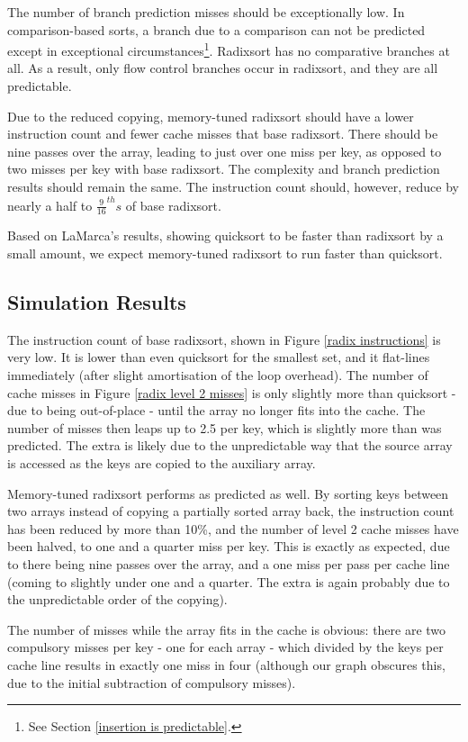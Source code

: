 The number of branch prediction misses should be exceptionally low. In
comparison-based sorts, a branch due to a comparison can not be predicted except
in exceptional circumstances\footnote{See Section \ref{insertion is
predictable}.}. Radixsort has no comparative branches at all. As a result, only
flow control branches occur in radixsort, and they are all predictable.

Due to the reduced copying, memory-tuned radixsort should have a lower
instruction count and fewer cache misses that base radixsort. There should be
nine passes over the array, leading to just over one miss per key, as opposed to
two misses per key with base radixsort. The complexity and branch prediction
results should remain the same. The instruction count should, however, reduce by
nearly a half to $\frac{9}{16}^{th}s$ of base radixsort.

Based on LaMarca's results, showing quicksort to be faster than radixsort by a
small amount, we expect memory-tuned radixsort to run faster than quicksort.

\subsection{Simulation Results}

The instruction count of base radixsort, shown in Figure \ref{radix
instructions} is very low. It is lower than even quicksort for the smallest set,
and it flat-lines immediately (after slight amortisation of the loop overhead).
The number of cache misses in Figure \ref{radix level 2 misses} is only slightly
more than quicksort - due to being out-of-place - until the array no longer fits
into the cache. The number of misses then leaps up to 2.5 per key, which is
slightly more than was predicted. The extra is likely due to the unpredictable
way that the source array is accessed as the keys are copied to the auxiliary
array.

Memory-tuned radixsort performs as predicted as well. By sorting keys between two
arrays instead of copying a partially sorted array back, the instruction count
has been reduced by more than 10\%, and the number of level 2 cache misses
have been halved, to one and a quarter miss per key. This is exactly
as expected, due to there being nine passes over the array, and a one miss
per pass per cache line (coming to slightly under one and a quarter. The extra
is again probably due to the unpredictable order of the copying).

The number of misses while the array fits in the cache is obvious: there
are two compulsory misses per key - one for each array - which divided by the
keys per cache line results in exactly one miss in four (although our graph
obscures this, due to the initial subtraction of compulsory misses).


